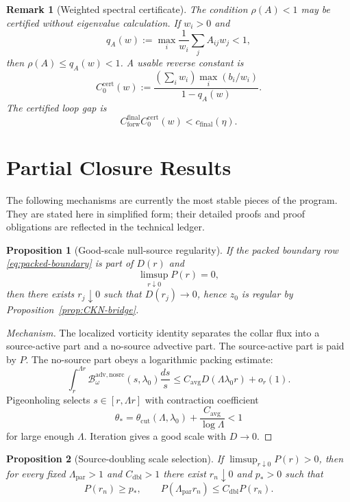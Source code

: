\documentclass[11pt]{article}
\newtheorem{proposition}{Proposition}
\newtheorem{remark}{Remark}
\begin{document}
\begin{remark}[Weighted spectral certificate]
The condition \(\rho(A)<1\) may be certified without eigenvalue calculation.
If \(w_i>0\) and
\[
q_A(w):=\max_i\frac{1}{w_i}\sum_j A_{ij}w_j<1,
\]
then \(\rho(A)\le q_A(w)<1\).  A usable reverse constant is
\[
C_0^{\mathrm{cert}}(w)
:=
\frac{(\sum_iw_i)\max_i(b_i/w_i)}{1-q_A(w)}.
\]
The certified loop gap is
\[
C_{\mathrm{forw}}^{\mathrm{final}}C_0^{\mathrm{cert}}(w)
<c_{\mathrm{final}}(\eta).
\]
\end{remark}

\clearpage
\section{Partial Closure Results}
\label{sec:partial-results}

The following mechanisms are currently the most stable pieces of the program.
They are stated here in simplified form; their detailed proofs and proof
obligations are reflected in the technical ledger.

\begin{proposition}[Good-scale null-source regularity]
\label{prop:null-source}
If the packed boundary row \eqref{eq:packed-boundary} is part of \(D(r)\) and
\[
\limsup_{r\downarrow0}P(r)=0,
\]
then there exists \(r_j\downarrow0\) such that \(D(r_j)\to0\), hence
\(z_0\) is regular by Proposition~\ref{prop:CKN-bridge}.
\end{proposition}

\begin{proof}[Mechanism]
The localized vorticity identity separates the collar flux into a
source-active part and a no-source advective part.  The source-active part is
paid by \(P\).  The no-source part obeys a logarithmic packing estimate:
\[
\int_r^{\Lambda r}
\mathcal B_\omega^{\mathrm{adv,nosrc}}(s,\lambda_0)
\frac{ds}{s}
\le
C_{\mathrm{avg}}D(\Lambda\lambda_0 r)+o_r(1).
\]
Pigeonholing selects \(s\in[r,\Lambda r]\) with contraction coefficient
\[
\theta_*=
\theta_{\mathrm{cut}}(\Lambda,\lambda_0)
+\frac{C_{\mathrm{avg}}}{\log\Lambda}<1
\]
for large enough \(\Lambda\).  Iteration gives a good scale with \(D\to0\).
\end{proof}

\begin{proposition}[Source-doubling scale selection]
\label{prop:source-doubling}
If \(\limsup_{r\downarrow0}P(r)>0\), then for every fixed
\(\Lambda_{\mathrm{par}}>1\) and \(C_{\mathrm{dbl}}>1\) there exist
\(r_n\downarrow0\) and \(p_*>0\) such that
\[
P(r_n)\ge p_*,
\qquad
P(\Lambda_{\mathrm{par}}r_n)\le C_{\mathrm{dbl}}P(r_n).
\]
\end{proposition}
\end{document}
